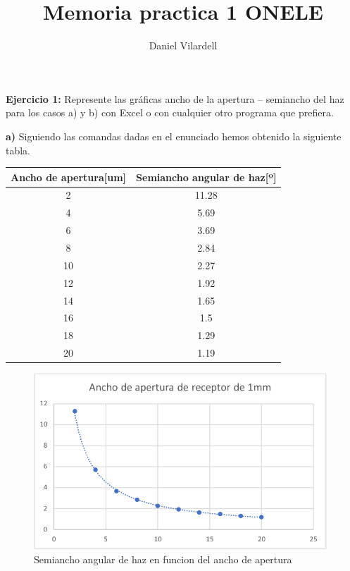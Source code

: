 \documentclass[12pt, a4papre]{article}
\author{Daniel Vilardell}
\title{Memoria practica 1 ONELE}
\date{}
\begin{document}
	\maketitle
	\textbf{Ejercicio 1:} Represente las gráficas ancho de la apertura – semiancho del haz para los casos a) y b) con Excel o con cualquier otro programa que prefiera.
	
	\textbf{a)} Siguiendo las comandas dadas en el enunciado hemos obtenido la siguiente tabla.
	\begin{center}
		\begin{tabular}{ ||c|c|| } 
			\hline
			Ancho de apertura[um]& Semiancho angular de haz[º]\\ 
			\hline
			2 & 11.28\\ 
			4 & 5.69\\ 
			6 & 3.69\\ 
			8 & 2.84\\ 
			10 & 2.27\\ 
			12 & 1.92\\ 
			14 & 1.65\\ 
			16 & 1.5\\ 
			18 & 1.29\\ 
			20 & 1.19\\ 
			\hline
		\end{tabular}
	\end{center}
	
	\begin{figure}[H]
		\begin{center}
		\includegraphics[width=110mm]{graph2.png}
		\caption{Semiancho angular de haz en funcion del ancho de apertura}
		\end{center}
	\end{figure}
	
\end{document}
